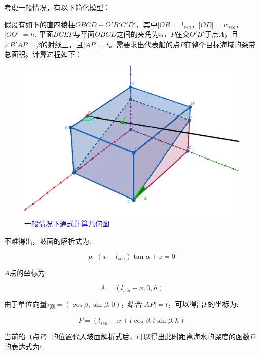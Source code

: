 考虑一般情况，有以下简化模型：

假设有如下的直四棱柱$OBCD - O'B'C'D'$，其中$|OB| = l_{sea}$，$|OD| = w_{sea}$，$|OO'| = h$. 平面$BCEF$与平面$OBCD$之间的夹角为$\alpha$，$P$在交$O'B'$于点$A$，且$\angle B'AP = \beta$的射线上，且$|AP| = t$。需要求出代表船的点$P$在整个目标海域的条带总面积。计算过程如下：

\begin{figure}[h]
    \centering
    \includegraphics[scale=0.3]{res/img/一般情况下通式计算几何图.png}
    \caption{\href{https://www.geogebra.org/m/jzwhwcqr}{\textcolor{blue}{一般情况下通式计算几何图}}}
    \label{fig:一般情况下通式计算几何图}
\end{figure}

不难得出，坡面的解析式为:

\begin{equation}
    p: \ 
    (x - l_{sea})\tan \alpha + z = 0
\end{equation}

$A$点的坐标为:

\begin{equation}
    A = (l_{sea} - x, 0, h)
\end{equation}

由于单位向量$\tau_\text{测} = (\cos \beta, \sin \beta, 0)$，结合$|AP| = t$，可以得出$P$的坐标为:

\begin{equation}
    P = (l_{sea} - x + t\cos \beta, 
        t\sin \beta, 
        h)
\end{equation}

当前船（点$P$）的位置代入坡面解析式后，可以得出此时距离海水的深度的函数$D$的表达式为:


